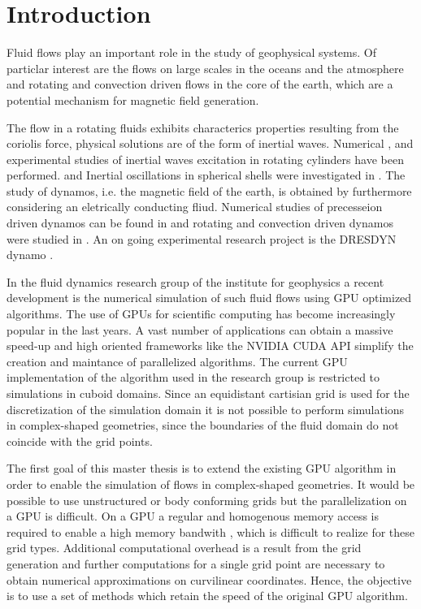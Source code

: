 \chapter*{Introduction}

Fluid flows play an important role in the study of geophysical systems.
Of particlar interest are the flows on large scales in the oceans
and the atmosphere and rotating and convection driven flows in the core of the earth, which are a potential mechanism
for magnetic field generation.

The flow in a rotating fluids exhibits characterics properties resulting from the coriolis force,
physical solutions are of the form of inertial waves.
Numerical \citep{Sauret2012}, \citep{Duguet} and experimental
studies \citep{QUOTE} of inertial waves excitation in rotating cylinders have been performed.
and Inertial oscillations in spherical shells were investigated in \citep{Tilgner1999}.
The study of dynamos, i.e. the magnetic field of the earth, is obtained by furthermore
considering an eletrically conducting fliud.
Numerical studies of precesseion driven dynamos can be found in \citep{Tilgner2005} and
rotating and convection driven dynamos were studied in \citep{Tilgner2012}.
An on going experimental research project is the DRESDYN dynamo \citep{Stefani2015}.

In the fluid dynamics research group of the institute for geophysics
a recent development is the numerical simulation of such fluid flows using GPU optimized algorithms.
The use of GPUs for scientific computing has become increasingly popular in the last years.
A vast number of applications  can obtain a massive speed-up and
high oriented frameworks like the NVIDIA CUDA API simplify the creation
and maintance of parallelized algorithms.
The current GPU implementation of the algorithm used in the research group is restricted
to simulations in cuboid domains.
Since an equidistant cartisian grid is used for the discretization of the simulation
domain it is not possible to perform simulations in complex-shaped geometries,
since the boundaries of the fluid domain  do not coincide with the grid points.

\bigbreak

The first goal of this master thesis is to extend the existing GPU algorithm
in order to enable the simulation of flows in complex-shaped geometries.
It would be possible to use  unstructured or body conforming grids
but the parallelization on a GPU is difficult.
On a GPU a regular and homogenous memory access is required to enable a high memory bandwith \citep{CUDABP},
which is difficult to realize for these grid types.
Additional computational overhead is a result from the grid generation and
further computations for a single grid point are necessary to obtain numerical approximations on curvilinear coordinates.
Hence, the objective is to use a set of methods which retain the speed of the original GPU algorithm.

